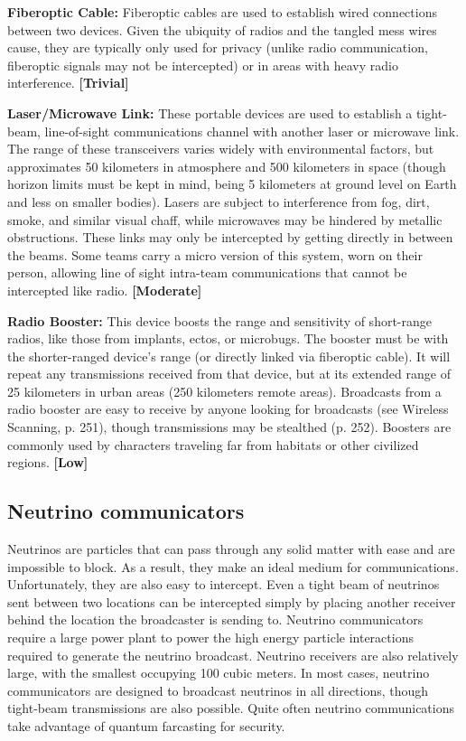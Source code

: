 \textbf{Fiberoptic Cable:} Fiberoptic cables are used to establish wired connections between two devices. Given the ubiquity of radios and the tangled mess wires cause, they are typically only used for privacy (unlike radio communication, fiberoptic signals may not be intercepted) or in areas with heavy radio interference. \textbf{[Trivial]}

\textbf{Laser/Microwave Link:} These portable devices are used to establish a tight-beam, line-of-sight communications channel with another laser or microwave link. The range of these transceivers varies widely with environmental factors, but approximates 50 kilometers in atmosphere and 500 kilometers in space (though horizon limits must be kept in mind, being 5 kilometers at ground level on Earth and less on smaller bodies). Lasers are subject to interference from fog, dirt, smoke, and similar visual chaff, while microwaves may be hindered by metallic obstructions. These links may only be intercepted by getting directly in between the beams. Some teams carry a micro version of this system, worn on their person, allowing line of sight intra-team communications that cannot be intercepted like radio. \textbf{[Moderate]}

\textbf{Radio Booster:} This device boosts the range and sensitivity of short-range radios, like those from implants, ectos, or microbugs. The booster must be with the shorter-ranged device’s range (or directly linked via fiberoptic cable). It will repeat any transmissions received from that device, but at its extended range of 25 kilometers in urban areas (250 kilometers remote areas). Broadcasts from a radio booster are easy to receive by anyone looking for broadcasts (see Wireless Scanning, p. 251), though transmissions may be stealthed (p. 252). Boosters are commonly used by characters traveling far from habitats or other civilized regions. \textbf{[Low]}


\subsection{Neutrino communicators}
\label{sec:neutrino-communicators}

Neutrinos are particles that can pass through any solid matter with ease and are impossible to block. As a result, they make an ideal medium for communications. Unfortunately, they are also easy to intercept. Even a tight beam of neutrinos sent between two locations can be intercepted simply by placing another receiver behind the location the broadcaster is sending to. Neutrino communicators require a large power plant to power the high energy particle interactions required to generate the neutrino broadcast. Neutrino receivers are also relatively large, with the smallest occupying 100 cubic meters. In most cases, neutrino communicators are designed to broadcast neutrinos in all directions, though tight-beam transmissions are also possible. Quite often neutrino communications take advantage of quantum farcasting for security.

